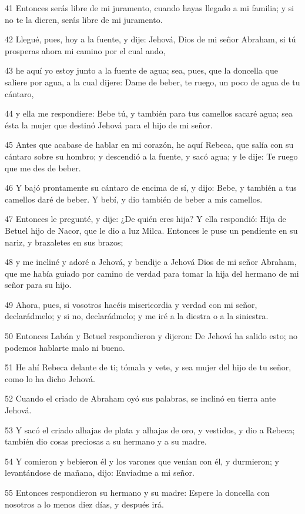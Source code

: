 41 Entonces serás libre de mi juramento, cuando hayas llegado a mi familia; y si no te la dieren, serás libre de mi juramento.

42 Llegué, pues, hoy a la fuente, y dije: Jehová, Dios de mi señor Abraham, si tú prosperas ahora mi camino por el cual ando,

43 he aquí yo estoy junto a la fuente de agua; sea, pues, que la doncella que saliere por agua, a la cual dijere: Dame de beber, te ruego, un poco de agua de tu cántaro,

44 y ella me respondiere: Bebe tú, y también para tus camellos sacaré agua; sea ésta la mujer que destinó Jehová para el hijo de mi señor.

45 Antes que acabase de hablar en mi corazón, he aquí Rebeca, que salía con su cántaro sobre su hombro; y descendió a la fuente, y sacó agua; y le dije: Te ruego que me des de beber.

46 Y bajó prontamente su cántaro de encima de sí, y dijo: Bebe, y también a tus camellos daré de beber. Y bebí, y dio también de beber a mis camellos.

47 Entonces le pregunté, y dije: ¿De quién eres hija? Y ella respondió: Hija de Betuel hijo de Nacor, que le dio a luz Milca. Entonces le puse un pendiente en su nariz, y brazaletes en sus brazos;

48 y me incliné y adoré a Jehová, y bendije a Jehová Dios de mi señor Abraham, que me había guiado por camino de verdad para tomar la hija del hermano de mi señor para su hijo.

49 Ahora, pues, si vosotros hacéis misericordia y verdad con mi señor, declarádmelo; y si no, declarádmelo; y me iré a la diestra o a la siniestra.

50 Entonces Labán y Betuel respondieron y dijeron: De Jehová ha salido esto; no podemos hablarte malo ni bueno.

51 He ahí Rebeca delante de ti; tómala y vete, y sea mujer del hijo de tu señor, como lo ha dicho Jehová.

52 Cuando el criado de Abraham oyó sus palabras, se inclinó en tierra ante Jehová.

53 Y sacó el criado alhajas de plata y alhajas de oro, y vestidos, y dio a Rebeca; también dio cosas preciosas a su hermano y a su madre.

54 Y comieron y bebieron él y los varones que venían con él, y durmieron; y levantándose de mañana, dijo: Enviadme a mi señor.

55 Entonces respondieron su hermano y su madre: Espere la doncella con nosotros a lo menos diez días, y después irá.

